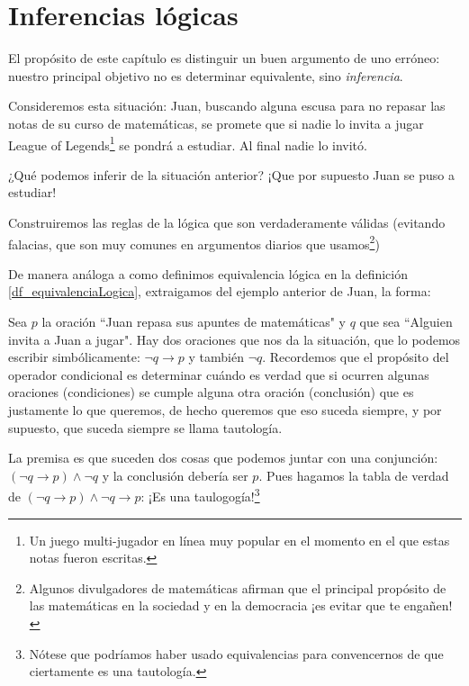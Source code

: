 \documentclass{book}
\begin{document}
\section{Inferencias lógicas}
El propósito de este capítulo es distinguir un buen argumento de uno erróneo: nuestro principal objetivo no es determinar equivalente, sino \emph{inferencia}.

Consideremos esta situación: Juan, buscando alguna escusa para no repasar las notas de su curso de matemáticas, se promete que si nadie lo invita a jugar League of Legends\footnote{Un juego multi-jugador en línea muy popular en el momento en el que estas notas fueron escritas.} se pondrá a estudiar. Al final nadie lo invitó.

¿Qué podemos inferir de la situación anterior? ¡Que por supuesto Juan se puso a estudiar!

Construiremos las reglas de la lógica que son verdaderamente válidas (evitando falacias, que son muy comunes en argumentos diarios que usamos\footnote{Algunos divulgadores de matemáticas afirman que el principal propósito de las matemáticas en la sociedad y en la democracia ¡es evitar que te engañen!})

De manera análoga a como definimos equivalencia lógica en la definición \ref{df_equivalenciaLogica}, extraigamos del ejemplo anterior de Juan, la forma:

Sea $p$ la oración ``Juan repasa sus apuntes de matemáticas" y $q$ que sea ``Alguien invita a Juan a jugar".
Hay dos oraciones que nos da la situación, que lo podemos escribir simbólicamente: $\neg q\rightarrow p$ y también $\neg q$.
Recordemos que el propósito del operador condicional es determinar cuándo es verdad que si ocurren algunas oraciones (condiciones) se cumple alguna otra oración (conclusión) que es justamente lo que queremos, de hecho queremos que eso suceda siempre, y por supuesto, que suceda siempre se llama tautología.

La premisa es que suceden dos cosas que podemos juntar con una conjunción: $(\neg q \rightarrow p) \wedge \neg q$ y la conclusión debería ser $p$. Pues hagamos la tabla de verdad de $(\neg q \rightarrow p) \wedge \neg q \rightarrow p$:
¡Es una taulogogía!\footnote{Nótese que podríamos haber usado equivalencias para convencernos de que ciertamente es una tautología.}
\end{document}
